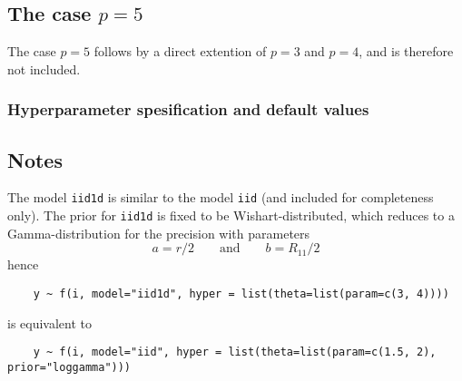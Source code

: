 \documentclass[a4paper,11pt]{article}
\begin{document}
\subsection*{The case $p=5$}

The case $p=5$ follows by a direct extention of $p=3$ and $p=4$, and
is therefore not included.

\subsubsection*{Hyperparameter spesification and default values}


\subsection*{Notes}

The model \texttt{iid1d} is similar to the model \texttt{iid} (and
included for completeness only). The prior for \texttt{iid1d} is fixed
to be Wishart-distributed, which reduces to a Gamma-distribution for
the precision with parameters
\begin{displaymath}
    a = r/2 \qquad\text{and}\qquad b = R_{11}/2
\end{displaymath}
hence
\begin{verbatim}
    y ~ f(i, model="iid1d", hyper = list(theta=list(param=c(3, 4))))
\end{verbatim}
is equivalent to
\begin{verbatim}
    y ~ f(i, model="iid", hyper = list(theta=list(param=c(1.5, 2), prior="loggamma")))
\end{verbatim}
\end{document}
